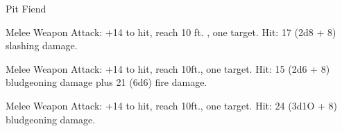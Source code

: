 \begin{monsterbox}{Pit Fiend}
\begin{monsteraction}[Bite]
\end{monsteraction}
\begin{monsteraction}[Claw]
Melee Weapon Attack: +14 to hit, reach 10 ft. , one target. Hit: 17 (2d8 + 8) slashing damage.
\end{monsteraction}
\begin{monsteraction}[Mace]
Melee Weapon Attack: +14 to hit, reach 10ft., one target. Hit: 15 (2d6 + 8) bludgeoning damage plus 21 (6d6) fire damage.
\end{monsteraction}
\begin{monsteraction}[Tail]
Melee Weapon Attack: +14 to hit, reach 10ft., one target. Hit: 24 (3d1O + 8) bludgeoning damage.
\end{monsteraction}
\end{monsterbox}